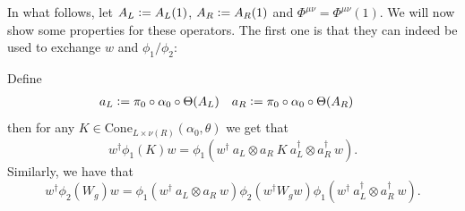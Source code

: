 \documentclass[11pt,a4paper,twoside]{article}
\numberwithin{equation}{section}
\begin{document}
	In what follows, let $A_L\vcentcolon= A_L(1)$, $A_R\vcentcolon= A_R(1)$ and $\Phi^{\mu\nu}=\Phi^{\mu\nu}(1)$. We will now show some properties for these operators. The first one is that they can indeed be used to exchange $w$ and $\phi_1/\phi_2$:
	\begin{lemma}\label{lem:TranslationOutOfPhi_KW}
		Define
		\begin{align}
			a_L&\vcentcolon= \pi_0\circ\alpha_0\circ\Theta(A_L)&a_R&\vcentcolon= \pi_0\circ\alpha_0\circ\Theta(A_R)
		\end{align}
		then for any $K\in\text{Cone}_{L\times\nu(R)}(\alpha_0,\theta)$ we get that
		\begin{equation}\label{eq:TranslationOutOfPhi_K}
			w^\dagger \phi_1(K)w=\phi_1(w^\dagger \: a_L\otimes a_R \: K \: a_L^\dagger\otimes a_R^\dagger \: w).
		\end{equation}
		Similarly, we have that
		\begin{equation}\label{eq:TranslationOutOfPhi_W}
			w^\dagger \phi_2(W_g)w=\phi_1(w^\dagger \: a_L\otimes a_R \: w)\phi_2(w^\dagger W_g w)\phi_1(w^\dagger \: a_L^\dagger\otimes a_R^\dagger \: w).
		\end{equation}
	\end{lemma}
\end{document}
